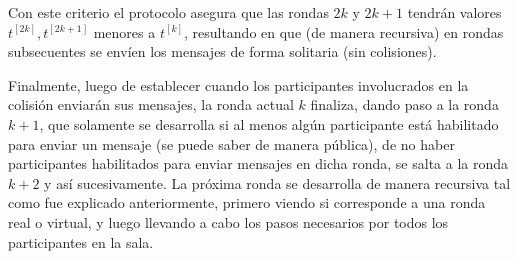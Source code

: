 Con este criterio el protocolo asegura que las rondas $2k$ y $2k + 1$ tendrán 
valores $t^{[2k]}, t^{[2k + 1]}$ menores a $t^{[k]}$, resultando en que (de 
manera recursiva) en rondas subsecuentes se envíen los mensajes de forma 
solitaria (sin colisiones).

Finalmente, luego de establecer cuando los participantes involucrados en la 
colisión enviarán sus mensajes, la ronda actual $k$ finaliza, dando paso a la 
ronda $k+1$, que solamente se desarrolla si al menos algún participante está 
habilitado para enviar un mensaje (se puede saber de manera pública), de no 
haber participantes habilitados para enviar mensajes en dicha ronda, se salta a
la ronda $k+2$ y así sucesivamente. La próxima ronda se desarrolla de manera 
recursiva tal como fue explicado anteriormente, primero viendo si corresponde a
una ronda real o virtual, y luego llevando a cabo los pasos necesarios por 
todos los participantes en la sala.